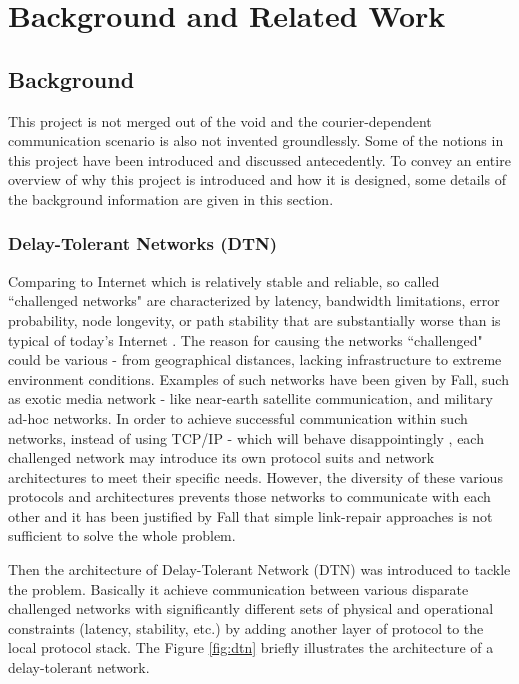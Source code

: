 \chapter{Background and Related Work}
\section{Background}
This project is not merged out of the void and the courier-dependent communication scenario is also not invented groundlessly. Some of the notions in this project have been introduced and discussed antecedently. To convey an entire overview of why this project is introduced and how it is designed, some details of the background information are given in this section.
\subsection{Delay-Tolerant Networks (DTN)}
Comparing to Internet which is relatively stable and reliable, so called ``challenged networks" are characterized by latency, bandwidth limitations, error probability, node longevity, or path stability that are substantially worse than is typical of today’s Internet \cite{Fall}. The reason for causing the networks ``challenged" could be various - from geographical distances, lacking infrastructure to extreme environment conditions. Examples of such networks have been given by Fall, such as exotic media network - like near-earth satellite communication, and military ad-hoc networks. In order to achieve successful communication within such networks, instead of using TCP/IP - which will behave disappointingly \cite{Burleigh}, each challenged network may introduce its own protocol suits and network architectures to meet their specific needs. However, the diversity of these various protocols and architectures prevents those networks to communicate with each other and it has been justified by Fall \cite{Fall} that simple link-repair approaches is not sufficient to solve the whole problem.

Then the architecture of Delay-Tolerant Network (DTN) was introduced to tackle the problem. Basically it achieve communication between various disparate challenged networks with significantly different sets of physical and operational constraints (latency, stability, etc.) by adding another layer of protocol to the local protocol stack. The Figure \ref{fig:dtn} briefly illustrates the architecture of a delay-tolerant network.

